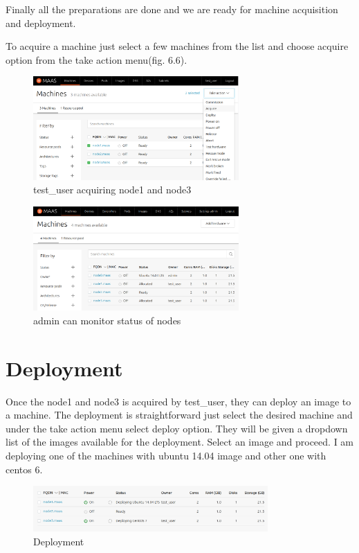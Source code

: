 Finally all the preparations are done and we are ready for machine acquisition and deployment. 

To acquire a machine just select a few machines from the list and choose acquire option from the take action menu(fig. 6.6).

\begin{figure}[!ht]
    \centering
    \includegraphics[width=0.7\textwidth]{images/6-6.png}
    \caption{test\_user acquiring node1 and node3}
\end{figure}

\begin{figure}[!ht]
    \centering
    \includegraphics[width=0.7\textwidth]{images/6-7.png}
    \caption{admin can monitor status of nodes}
\end{figure}

\section{Deployment}

Once the node1 and node3 is acquired by test\_user, they can deploy an image to a machine. The deployment is straightforward just select the desired machine and under the take action menu select deploy option. They will be given a dropdown list of the images available for the deployment. Select an image and proceed. I am deploying one of the machines with ubuntu 14.04 image and other one with centos 6.


\begin{figure}[!ht]
    \centering
    \includegraphics[width=0.8\textwidth]{images/6-8.png}
    \caption{Deployment}
\end{figure}

